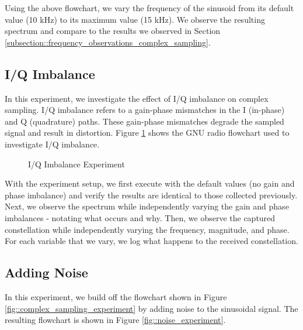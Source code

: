 \documentclass{article}
\begin{document}
Using the above flowchart, we vary the frequency of the sinusoid from its default value (10 kHz) to its maximum value (15 kHz). We observe the resulting spectrum and compare to the results we observed in Section \ref{subsection::frequency_observations_complex_sampling}.

\subsection{I/Q Imbalance}

In this experiment, we investigate the effect of I/Q imbalance on complex sampling. I/Q imbalance refers to a gain-phase mismatches in the I (in-phase) and Q (quadrature) paths. These gain-phase mismatches degrade the sampled signal and result in distortion. Figure \ref{fig::iq_imbalance_experiment} shows the GNU radio flowchart used to investigate I/Q imbalance.

\begin{figure}[H]
	\centerline{}
	\caption{I/Q Imbalance Experiment}
	\label{fig::iq_imbalance_experiment}
\end{figure}

With the experiment setup, we first execute with the default values (no gain and phase imbalance) and verify the results are identical to those collected previously. Next, we observe the spectrum while independently varying the gain and phase imbalances - notating what occurs and why. Then, we observe the captured constellation while independently varying the frequency, magnitude, and phase. For each variable that we vary, we log what happens to the received constellation.  

\subsection{Adding Noise}

In this experiment, we build off the flowchart shown in Figure \ref{fig::complex_sampling_experiment} by adding noise to the sinusoidal signal. The resulting flowchart is shown in Figure \ref{fig::noise_experiment}.
\end{document}
